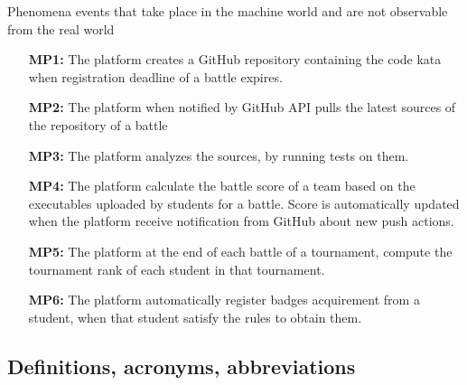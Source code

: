 \documentclass{article}
\newcounter{subsubsubsection}[subsubsection]
\begin{document}
Phenomena events that take place in the machine world and are not observable from the real world
\begin{enumerate}
    \item[\textbf{MP1:}] The platform creates a GitHub repository containing the code kata when registration deadline of a battle expires.
    \item[\textbf{MP2:}] The platform when notified by GitHub API pulls the latest sources of the repository of a battle
    \item[\textbf{MP3:}] The platform analyzes the sources, by running tests on them.
    \item[\textbf{MP4:}] The platform calculate the battle score of a team based on the executables uploaded by students for a battle. Score is automatically updated when the platform receive notification from GitHub about new push actions.
    \item[\textbf{MP5:}] The platform at the end of each battle of a tournament, compute the tournament rank of each student in that tournament.
    \item[\textbf{MP6:}] The platform automatically register badges acquirement from a student, when that student satisfy the rules to obtain them.
\end{enumerate}


\subsection{Definitions, acronyms, abbreviations}
\end{document}
